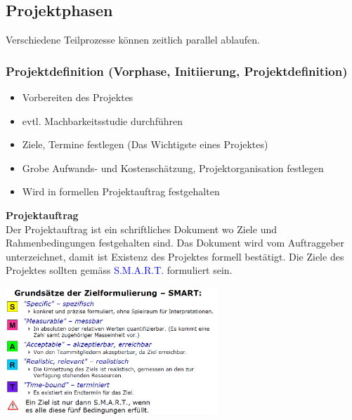 \subsection{Projektphasen}
Verschiedene Teilprozesse können zeitlich parallel ablaufen. 
\subsubsection{Projektdefinition (Vorphase, Initiierung, Projektdefinition)}
\begin{itemize}
	\item Vorbereiten des Projektes
	\item evtl. Machbarkeitsstudie durchführen
	\item Ziele, Termine festlegen (Das Wichtigste eines Projektes)
	\item Grobe Aufwands- und Kostenschätzung, Projektorganisation festlegen
	\item Wird in formellen Projektauftrag festgehalten
\end{itemize}
	\begin{minipage}{11cm}
		\textbf{Projektauftrag} \\
		Der Projektauftrag ist ein schriftliches Dokument wo Ziele und Rahmenbedingungen festgehalten sind. Das Dokument wird vom Auftraggeber unterzeichnet, damit ist Existenz des Projektes formell bestätigt. \newline Die Ziele des Projektes sollten gemäss \textcolor{blue}{S.M.A.R.T.} formuliert sein. 
	\end{minipage}
	\begin{minipage}{8cm}
		\includegraphics[width=8cm]{images/pmstart.png}
	\end{minipage}
	

